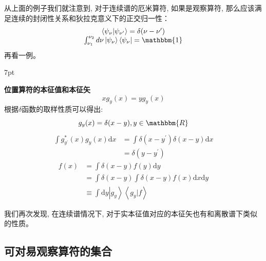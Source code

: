 \documentclass[a4paper,zihao=-4,linespread=1]{ctexrep}
\newenvironment{thinknote}{%
\def\FrameCommand{%
\hspace{1pt}%
{\color{BurlyWood}\vrule width 2pt}%
{\color{formalshade}\vrule width 4pt}%
\colorbox{formalshade}%
}%
\MakeFramed{\advance\hsize-\width\FrameRestore}%
\noindent\hspace{-4.55pt}%
\begin{adjustwidth}{}{7pt}%
\vspace{2pt}\vspace{2pt}%
}
{%
\vspace{2pt}\end{adjustwidth}\endMakeFramed%
}
\begin{document}
    从上面的例子我们就注意到, 对于连续谱的厄米算符, 如果是观察算符, 那么应该满足连续的封闭性关系和狄拉克意义下的正交归一性：
    \begin{equation*}
        \begin{array}{c}
            \left \langle \psi_\nu   | \psi_{\nu^\prime }  \right \rangle=\delta (\nu -\nu ^\prime ) \\
            \int_{{\nu _1}}^{{\nu _2}} {d\nu \left| {{\psi _\nu }} \right\rangle \left\langle {{\psi _\nu }} \right|} =\mathbbm{1}
        \end{array}
    \end{equation*}
    再看一例。
    \begin{thinknote}
        \textbf{位置算符的本征值和本征矢}
        \begin{equation}
            xg_y(x)=yg_y(x)
        \end{equation}
        根据$\delta$函数的取样性质可以得出:
        \[g_y(x)=\delta(x-y),y\in\mathbbm{R}\]
        \begin{align*}
            \int g_{y^\prime} ^*(x)g_y(x)\mathrm{d}x & = \int \delta (x-y^\prime )\delta(x-y)\mathrm{d}x\\ 
            & = \delta (y-y^\prime )
        \end{align*}
        \begin{align*}
            f(x)&=\int\delta(x-y)f(y)\mathrm{d}y\\
                &=\int\delta(x-y)\int\delta(x-y)f(x)\mathrm{d}x\mathrm{d}y\\
                &\equiv\int\mathrm{d}y\left | g_y \right \rangle\left \langle g_y  | f \right \rangle   
        \end{align*}
    \end{thinknote}
    我们再次发现, 在连续谱情况下, 对于实本征值对应的本征矢也有和离散谱下类似的性质。
    \subsection*{可对易观察算符的集合}













    
\end{document}
